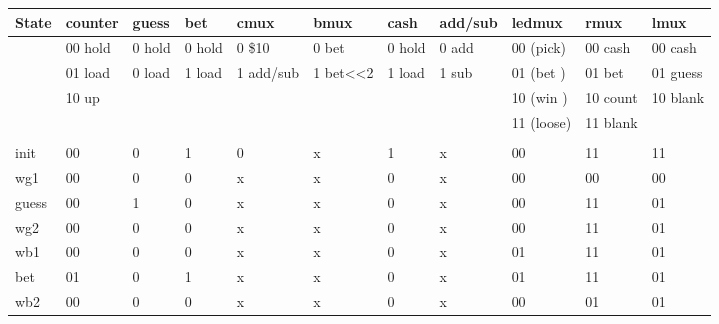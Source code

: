 \begin{enumerate}
\begin{onlysolution}
{                {\tiny
                    \begin{tabular}{l|l|l|l|l|l|l|l|l|l|l}
                        State &  counter& guess  & bet    & cmux      & bmux     & cash   & add/sub & ledmux
                        & rmux   & lmux \\ \hline
                        & 00 hold & 0 hold & 0 hold & 0 \$10    & 0 bet    & 0 hold & 0 add  & 00 (pick) &00
                        cash &00 cash  \\ \hline
                        & 01 load & 0 load & 1 load & 1 add/sub & 1 bet<<2 & 1 load & 1 sub  & 01 (bet ) &01
                        bet  &01 guess \\ \hline
                        & 10 up   &        &        &            &          &        &        & 10 (win ) &10
                        count&10 blank \\ \hline
                        &         &        &        &            &          &        &        & 11 (loose)&11
                        blank&         \\ \hline
                        &         &        &        &            &          &        &        &          &
                        &   \\ \hline
                        init  & 00      & 0      &  1     & 0          & x        &  1     &  x     & 00
                        &  11     & 11\\ \hline
                        wg1   & 00      & 0      &  0     & x          & x        &  0     &  x     & 00
                        &  00     & 00\\ \hline
                        guess & 00      & 1      &  0     & x          & x        &  0     &  x     & 00
                        &  11     & 01\\ \hline
                        wg2   & 00      & 0      &  0     & x          & x        &  0     &  x     & 00
                        &  11     & 01\\ \hline
                        wb1   & 00      & 0      &  0     & x          & x        &  0     &  x     & 01
                        &  11     & 01\\ \hline
                        bet   & 01      & 0      &  1     & x          & x        &  0     &  x     & 01
                        &  11     & 01\\ \hline
                        wb2   & 00      & 0      &  0     & x          & x        &  0     &  x     & 00
                        &  01     & 01\\ \hline

\end{tabular}}}
\end{onlysolution}
\end{enumerate}
